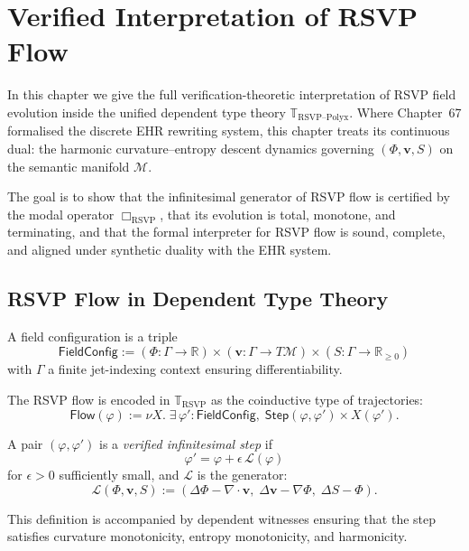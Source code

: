 \chapter{Verified Interpretation of RSVP Flow}
\label{ch:68}

In this chapter we give the full verification-theoretic interpretation of 
RSVP field evolution inside the unified dependent type theory 
$\mathbb{T}_{\mathrm{RSVP\text{--}Polyx}}$.
Where Chapter~67 formalised the discrete EHR rewriting system, this chapter 
treats its continuous dual: the harmonic curvature--entropy descent dynamics 
governing $(\Phi,\mathbf{v},S)$ on the semantic manifold $\mathcal{M}$.

The goal is to show that the infinitesimal generator of RSVP flow is certified 
by the modal operator $\Box_{\mathrm{RSVP}}$, that its evolution is total, 
monotone, and terminating, and that the formal interpreter for RSVP flow is 
sound, complete, and aligned under synthetic duality with the EHR system.

\section{RSVP Flow in Dependent Type Theory}

A field configuration is a triple
\[
\mathsf{FieldConfig}
  := (\Phi : \Gamma \to \mathbb{R})
     \times (\mathbf{v} : \Gamma \to T\mathcal{M})
     \times (S : \Gamma \to \mathbb{R}_{\ge 0})
\]
with $\Gamma$ a finite jet-indexing context ensuring differentiability.

The RSVP flow is encoded in $\mathbb{T}_{\mathrm{RSVP}}$ as the coinductive 
type of trajectories:
\[
\mathsf{Flow}(\varphi) := 
  \nu X.\; \exists\,\varphi' : \mathsf{FieldConfig},\;
    \mathsf{Step}(\varphi,\varphi') \times X(\varphi').
\]

\begin{definition}
A pair $(\varphi,\varphi')$ is a \emph{verified infinitesimal step} if
\[
\varphi' = \varphi + \epsilon\,\mathcal{L}(\varphi)
\]
for $\epsilon>0$ sufficiently small, and 
$\mathcal{L}$ is the generator:
\[
\mathcal{L}(\Phi,\mathbf{v},S)
  := (\Delta\Phi - \nabla\!\cdot\!\mathbf{v},\;
      \Delta\mathbf{v} - \nabla\Phi,\;
      \Delta S - \Phi).
\]
\end{definition}

This definition is accompanied by dependent witnesses ensuring that the step 
satisfies curvature monotonicity, entropy monotonicity, and harmonicity.

